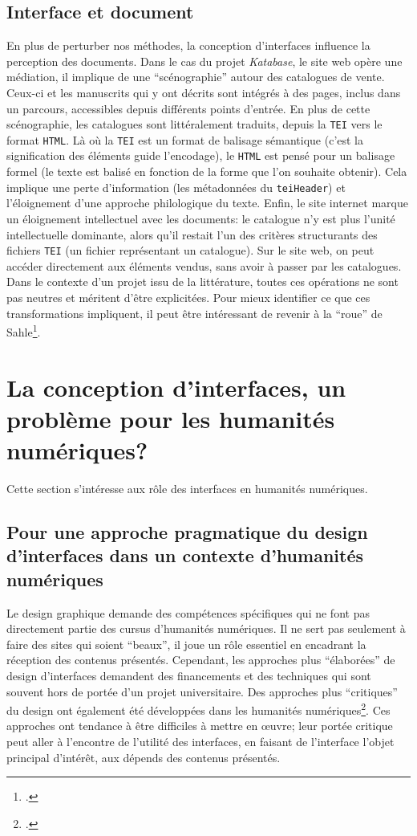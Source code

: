 \documentclass[a4paper, 12pt, twoside]{book}
\newcommand{\html}{\texttt{HTML}}
\newcommand{\ktb}{\textit{Katabase}}
\newcommand{\tei}{\texttt{TEI}}
\begin{document}
\subsection{Interface et document}
En plus de perturber nos méthodes, la conception d'interfaces influence la perception des documents. Dans le cas du projet \ktb, le site web opère une médiation, il implique de une \enquote{scénographie} autour des catalogues de vente. Ceux-ci et les manuscrits qui y ont décrits sont intégrés à des pages, inclus dans un parcours, accessibles depuis différents points d'entrée. En plus de cette scénographie, les catalogues sont littéralement traduits, depuis la \tei{} vers le format \html{}. Là où la \tei{} est un format de balisage sémantique (c'est la signification des éléments guide l'encodage), le \html{} est pensé pour un balisage formel (le texte est balisé en fonction de la forme que l'on souhaite obtenir). Cela implique une perte d'information (les métadonnées du \texttt{teiHeader}) et l'éloignement d'une approche philologique du texte. Enfin, le site internet marque un éloignement intellectuel avec les documents: le catalogue n'y est plus l'unité intellectuelle dominante, alors qu'il restait l'un des critères structurants des fichiers \tei{} (un fichier représentant un catalogue). Sur le site web, on peut accéder directement aux éléments vendus, sans avoir à passer par les catalogues. Dans le contexte d'un projet issu de la littérature, toutes ces opérations ne sont pas neutres et méritent d'être explicitées. Pour mieux identifier ce que ces transformations impliquent, il peut être intéressant de revenir à la \enquote{roue} de Sahle\footcite[p. 11]{sahle_digital_2016}.


\section{La conception d'interfaces, un problème pour les humanités numériques?}
Cette section s'intéresse aux rôle des interfaces en humanités numériques.

\subsection{Pour une approche pragmatique du design d'interfaces dans un contexte d'humanités numériques}
Le design graphique demande des compétences spécifiques qui ne font pas directement partie des cursus d'humanités numériques. Il ne sert pas seulement à faire des sites qui soient \enquote{beaux}, il joue un rôle essentiel en encadrant la réception des contenus présentés. Cependant, les approches plus \enquote{élaborées} de design d'interfaces demandent des financements et des techniques qui sont souvent hors de portée d'un projet universitaire. Des approches plus \enquote{critiques} du design ont également été développées dans les humanités numériques\footcite{drucker_visualisation_2020}. Ces approches ont tendance à être difficiles à mettre en œuvre; leur portée critique peut aller à l'encontre de l'utilité des interfaces, en faisant de l'interface l'objet principal d'intérêt, aux dépends des contenus présentés. 
\end{document}
